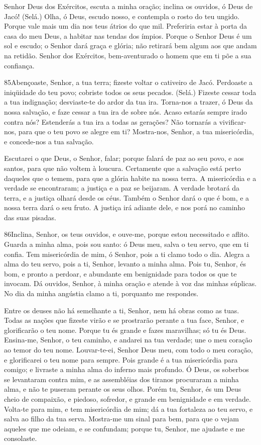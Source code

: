 Senhor Deus dos Exércitos, escuta a minha oração; inclina os
ouvidos, ó Deus de Jacó! (Selá.) Olha, ó Deus, escudo nosso, e
contempla o rosto do teu ungido. Porque vale mais um dia nos
teus átrios do que mil. Preferiria estar à porta da casa do meu
Deus, a habitar nas tendas dos ímpios. Porque o Senhor Deus é
um sol e escudo; o Senhor dará graça e glória; não retirará bem
algum aos que andam na retidão. Senhor dos Exércitos,
bem-aventurado o homem que em ti põe a sua confiança.

\bigskip

\lettrine{85}{}Abençoaste, Senhor, a tua terra; fizeste voltar
o cativeiro de Jacó. Perdoaste a iniqüidade do teu povo;
cobriste todos os seus pecados. (Selá.) Fizeste cessar toda a
tua indignação; desviaste-te do ardor da tua ira. Torna-nos a
trazer, ó Deus da nossa salvação, e faze cessar a tua ira de sobre
nós. Acaso estarás sempre irado contra nós? Estenderás a tua ira
a todas as gerações? Não tornarás a vivificar-nos, para que o
teu povo se alegre em ti? Mostra-nos, Senhor, a tua
misericórdia, e concede-nos a tua salvação.

Escutarei o que Deus, o Senhor, falar; porque falará de paz ao seu
povo, e aos santos, para que não voltem à loucura. Certamente
que a salvação está perto daqueles que o temem, para que a glória
habite na nossa terra. A misericórdia e a verdade se
encontraram; a justiça e a paz se beijaram. A verdade brotará
da terra, e a justiça olhará desde os céus. Também o Senhor
dará o que é bom, e a nossa terra dará o seu fruto. A justiça
irá adiante dele, e nos porá no caminho das suas pisadas.

\bigskip

\lettrine{86}{}Inclina, Senhor, os teus ouvidos, e ouve-me,
porque estou necessitado e aflito. Guarda a minha alma, pois sou
santo: ó Deus meu, salva o teu servo, que em ti confia. Tem
misericórdia de mim, ó Senhor, pois a ti clamo todo o dia.
Alegra a alma do teu servo, pois a ti, Senhor, levanto a minha
alma. Pois tu, Senhor, és bom, e pronto a perdoar, e abundante
em benignidade para todos os que te invocam. Dá ouvidos, Senhor,
à minha oração e atende à voz das minhas súplicas. No dia da
minha angústia clamo a ti, porquanto me respondes.

Entre os deuses não há semelhante a ti, Senhor, nem há obras como
as tuas. Todas as nações que fizeste virão e se prostrarão
perante a tua face, Senhor, e glorificarão o teu nome.
 Porque tu és grande e fazes maravilhas; só tu és Deus. Ensina-me, Senhor, o teu caminho, e andarei na tua verdade; une o
meu coração ao temor do teu nome. Louvar-te-ei, Senhor Deus
meu, com todo o meu coração, e glorificarei o teu nome para sempre.
Pois grande é a tua misericórdia para comigo; e livraste a
minha alma do inferno mais profundo. Ó Deus, os soberbos se
levantaram contra mim, e as assembléias dos tiranos procuraram a
minha alma, e não te puseram perante os seus olhos. Porém tu,
Senhor, és um Deus cheio de compaixão, e piedoso, sofredor, e grande
em benignidade e em verdade. Volta-te para mim, e tem
misericórdia de mim; dá a tua fortaleza ao teu servo, e salva ao
filho da tua serva. Mostra-me um sinal para bem, para que o
vejam aqueles que me odeiam, e se confundam; porque tu, Senhor, me
ajudaste e me consolaste.

